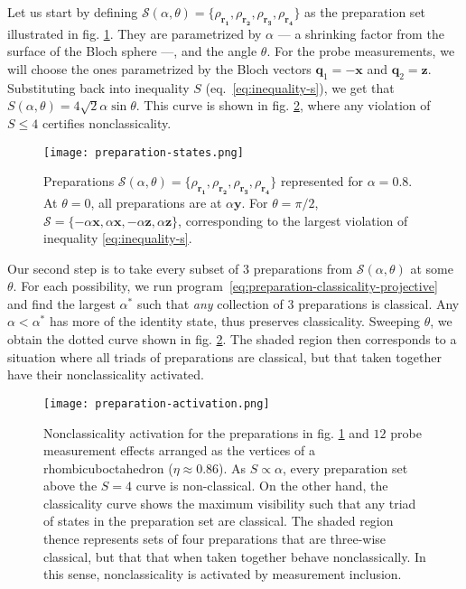             Let us start by defining $\mathcal{S}(\alpha, \theta) = \{ \rho_{\mathbf{r_1}}, \rho_{\mathbf{r_2}}, \rho_{\mathbf{r_3}}, \rho_{\mathbf{r_4}} \}$ as the preparation set illustrated in fig. \ref{fig:preparation-set-activation}. They are parametrized by $\alpha$ --- a shrinking factor from the surface of the Bloch sphere ---, and the angle $\theta$. For the probe measurements, we will choose the ones parametrized by the Bloch vectors $\mathbf{q}_1 = - \mathbf{x}$ and  $\mathbf{q}_2 = \mathbf{z}$. Substituting back into inequality $S$ (eq.~\eqref{eq:inequality-s}), we get that $S(\alpha, \theta) = 4\sqrt{2} \alpha \sin \theta$. This curve is shown in fig. \ref{fig:nonclassicality-activation}, where any violation of $S \leq 4$ certifies nonclassicality.

            \begin{figure}
                \centering
                \texttt{[image: preparation-states.png]}
                \caption{Preparations $\mathcal{S}(\alpha, \theta) = \{ \rho_{\mathbf{r_1}}, \rho_{\mathbf{r_2}}, \rho_{\mathbf{r_3}}, \rho_{\mathbf{r_4}} \}$ represented for $\alpha=0.8$. At $\theta=0$, all preparations are at $\alpha \mathbf{y}$. For $\theta = \pi/2$, $\mathcal{S} =  \{ -\alpha\mathbf{x}, \alpha\mathbf{x}, -\alpha\mathbf{z}, \alpha\mathbf{z} \}$, corresponding to the largest violation of inequality \eqref{eq:inequality-s}.}
            \label{fig:preparation-set-activation}
            \end{figure}

            Our second step is to take every subset of $3$ preparations from $\mathcal{S}(\alpha, \theta)$ at some $\theta$. For each possibility, we run program~\eqref{eq:preparation-classicality-projective} and find the largest $\alpha^*$ such that \emph{any} collection of $3$ preparations is classical. Any $\alpha < \alpha^*$ has more of the identity state, thus preserves classicality. Sweeping $\theta$, we obtain the dotted curve shown in fig. \ref{fig:nonclassicality-activation}. The shaded region then corresponds to a situation where all triads of preparations are classical, but that taken together have their nonclassicality activated.

            \begin{figure}
                \centering
                \texttt{[image: preparation-activation.png]}
                \caption{Nonclassicality activation for the preparations in fig. \ref{fig:preparation-set-activation} and $12$ probe measurement effects arranged as the vertices of a rhombicuboctahedron ($\eta \approx 0.86$). As $S \propto \alpha$, every preparation set above the $S=4$ curve is non-classical. On the other hand, the classicality curve shows the maximum visibility such that any triad of states in the preparation set are classical. The shaded region thence represents sets of four preparations that are three-wise classical, but that that when taken together behave nonclassically. In this sense, nonclassicality is activated by measurement inclusion.}
            \label{fig:nonclassicality-activation}
            \end{figure}
            
